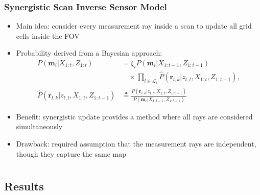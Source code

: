 \documentclass[11pt,professionalfonts,hyperref={pdftex,pdfpagemode=none,pdfstartview=FitH}]{beamer}
\renewcommand{\emph}[1]{\textit{\textbf{\color{blue}{#1}}}}
\begin{document}
\begin{frame}
\frametitle{Synergistic Scan Inverse Sensor Model}

\begin{itemize}
	\item Main idea: consider every measurement ray inside a scan \emph{simultaneously} to update all grid cells inside the FOV
	\item Probability derived from a Bayesian approach:
	\begin{align*}
		P(\mathbf{m}_i|X_{1:t},Z_{1:t})
		&=\xi_i P(\mathbf{m}_i|{X_{1:t-1}},Z_{1:t-1})\nonumber\\&\quad\times
		\prod_{l\in\mathcal L_i}
		\hat P(\mathbf{r}_{l,k}|z_{t,l},X_{1:t},Z_{1:t-1}),
		\\
		\hat P(\mathbf{r}_{l,k}|z_{t,l},X_{1:t},Z_{1:t-1})&
		\triangleq \frac{\tilde P(\mathbf{r}_{l,k}|z_{t,l},X_{1:t},Z_{1:t-1})}{P(\mathbf{m}_i|X_{1:t-1},Z_{1:t-1})}
	\end{align*}
	\item Benefit: synergistic update provides a method where all rays are considered simultaneously
	\item Drawback: required assumption that the measurement rays are independent, though they capture the same map
\end{itemize}

\end{frame}


\section*{}
\subsection*{Results}
\end{document}

